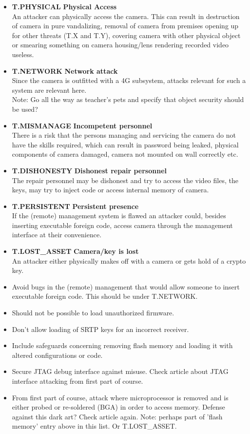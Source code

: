 \documentclass[10pt]{article}
\newcommand{\threat}[3]{\item{\textbf{T.#1} \hfill \textbf{#2} \\ #3}}
\begin{document}
  \begin{itemize}[label={}]
    \threat{PHYSICAL}{Physical Access} {
	An attacker can physically access the camera. This can result in destruction of camera in pure vandalizing, removal of camera from premises opening up for other threats (T.X and T.Y),
	covering camera with other physical object or smearing something on camera housing/lens rendering recorded video useless. }
    \threat{NETWORK}{Network attack} {
	Since the camera is outfitted with a 4G subsystem, attacks relevant for such a system are relevant here. \\
	Note: Go all the way as teacher's pets and specify that object security should be used?}
    \threat{MISMANAGE}{Incompetent personnel} {
	There is a risk that the persons managing and servicing the camera do not have the skills required, which can result in password being leaked, physical components of camera damaged, camera not mounted on wall correctly etc.}
    \threat{DISHONESTY}{Dishonest repair personnel}{ %
	The repair personnel may be dishonest and try to access the video files, the keys, may try to inject code or access internal memory of camera.}
    \threat{PERSISTENT}{Persistent presence}{
	If the (remote) management system is flawed an attacker could, besides inserting executable foreign code, access camera through the management interface at their convenience.}
    \threat{LOST\_ASSET}{Camera/key is lost}{An attacker either physically makes off with a camera or gets hold of a crypto key.}

    \item{Avoid bugs in the (remote) management that would allow someone to
      insert executable foreign code. This should be under T.NETWORK.}
    \item{Should not be possible to load unauthorized firmware.}
    \item{Don't allow loading of SRTP keys for an incorrect receiver.}
    \item{Include safeguards concerning removing flash memory and loading it
      with altered configurations or code.}
    \item{Secure JTAG debug interface against misuse. Check article about JTAG interface attacking from first part of course.}
    \item{From first part of course, attack where microprocessor is removed and is either probed or re-soldered (BGA) in order to access memory. Defense against this dark art? Check article again. Note: perhaps part of 'flash memory' entry above in this list. Or T.LOST\_ASSET.}
  \end{itemize}
\end{document}
